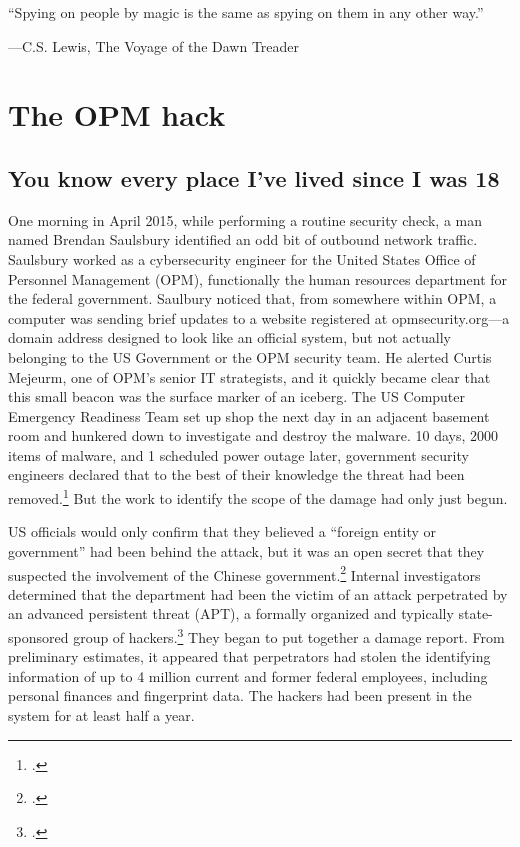 \documentclass[11pt]{memoir}
\begin{document}
\begin{refsegment}
\epigraph{``Spying on people by magic is the same as spying on them in any other way.''}{---\textup{C.S. Lewis}, The Voyage of the Dawn Treader}

\section{The OPM hack}
\subsection{You know every place I've lived since I was 18}
One morning in April 2015, while performing a routine security check, a man named Brendan Saulsbury identified an odd bit of outbound network traffic. Saulsbury worked as a cybersecurity engineer for the United States Office of Personnel Management (OPM), functionally the human resources department for the federal government. Saulbury noticed that, from somewhere within OPM, a computer was sending brief updates to a website registered at opmsecurity.org---a domain address designed to look like an official system, but not actually belonging to the US Government or the OPM security team. He alerted Curtis Mejeurm, one of OPM's senior IT strategists, and it quickly became clear that this small beacon was the surface marker of an iceberg. The US Computer Emergency Readiness Team set up shop the next day in an adjacent basement room and hunkered down to investigate and destroy the malware. 10 days, 2000 items of malware, and 1 scheduled power outage later, government security engineers declared that to the best of their knowledge the threat had been removed.\footcite{koerner_inside_2016} But the work to identify the scope of the damage had only just begun.

US officials would only confirm that they believed a ``foreign entity or government'' had been behind the attack, but it was an open secret that they suspected the involvement of the Chinese government.\footcite{spetalnick_china_2015} Internal investigators determined that the department had been the victim of an attack perpetrated by an advanced persistent threat (APT), a formally organized and typically state-sponsored group of hackers.\footcite[Attributing a cyberattack is difficult because hackers have endless means to obscure their orgins. In this case, however, the first clue that investigators found was left there on purpose. A particularly effective group of hackers tied to China has made it a calling card of sorts to register sites using the names of members of Marvel's comic book superhero group, The Avengers. In this case, opmsecurity.org was registered under the name ``Steve Rogers,'' better known as Captain America.]{koerner_inside_2016} They began to put together a damage report. From preliminary estimates, it appeared that perpetrators had stolen the identifying information of up to 4 million current and former federal employees, including personal finances and fingerprint data. The hackers had been present in the system for at least half a year.


\end{refsegment}
\end{document}
